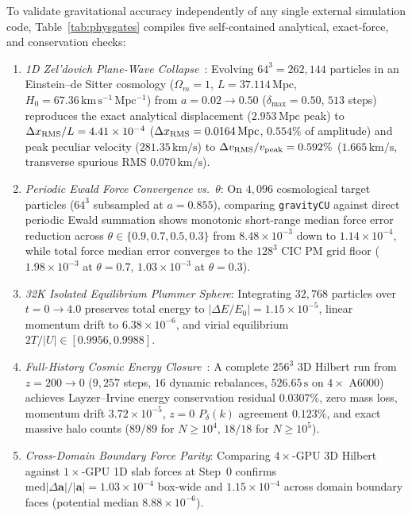 \documentclass[aps,prd,reprint,superscriptaddress,nofootinbib,amsmath,amssymb,floatfix,longbibliography]{revtex4-2}
\begin{document}
To validate gravitational accuracy independently of any single external simulation code, Table~\ref{tab:physgates} compiles five self-contained analytical, exact-force, and conservation checks:
\begin{enumerate}
  \item \textit{1D Zel'dovich Plane-Wave Collapse}~\citep{Zeldovich1970}: Evolving $64^3 = 262{,}144$ particles in an Einstein--de Sitter cosmology ($\Omega_m = 1$, $L = 37.114\,\mathrm{Mpc}$, $H_0 = 67.36\,\mathrm{km\,s^{-1}\,Mpc^{-1}}$) from $a = 0.02 \rightarrow 0.50$ ($\delta_{\max} = 0.50$, $513$ steps) reproduces the exact analytical displacement ($2.953\,\mathrm{Mpc}$ peak) to $\Delta x_{\rm RMS}/L = 4.41\times 10^{-4}$ ($\Delta x_{\rm RMS} = 0.0164\,\mathrm{Mpc}$, $0.554\%$ of amplitude) and peak peculiar velocity ($281.35\,\mathrm{km/s}$) to $\Delta v_{\rm RMS}/v_{\rm peak} = 0.592\%$ ($1.665\,\mathrm{km/s}$, transverse spurious RMS $0.070\,\mathrm{km/s}$).
  \item \textit{Periodic Ewald Force Convergence vs.\ $\theta$}: On $4{,}096$ cosmological target particles ($64^3$ subsampled at $a = 0.855$), comparing \texttt{gravityCU} against direct periodic Ewald summation shows monotonic short-range median force error reduction across $\theta \in \{0.9, 0.7, 0.5, 0.3\}$ from $8.48\times 10^{-3}$ down to $1.14\times 10^{-4}$, while total force median error converges to the $128^3$ CIC PM grid floor ($1.98\times 10^{-3}$ at $\theta = 0.7$, $1.03\times 10^{-3}$ at $\theta = 0.3$).
  \item \textit{32K Isolated Equilibrium Plummer Sphere}: Integrating $32{,}768$ particles over $t = 0 \rightarrow 4.0$ preserves total energy to $|\Delta E / E_0| = 1.15\times 10^{-5}$, linear momentum drift to $6.38\times 10^{-6}$, and virial equilibrium $2T/|U| \in [0.9956, 0.9988]$.
  \item \textit{Full-History Cosmic Energy Closure}~\citep{Layzer1963}: A complete $256^3$ 3D Hilbert run from $z = 200 \rightarrow 0$ ($9{,}257$ steps, $16$ dynamic rebalances, $526.65\,\mathrm{s}$ on $4\times$ A6000) achieves Layzer--Irvine energy conservation residual $0.0307\%$, zero mass loss, momentum drift $3.72\times 10^{-5}$, $z=0$ $P_\delta(k)$ agreement $0.123\%$, and exact massive halo counts ($89/89$ for $N\ge 10^4$, $18/18$ for $N\ge 10^5$).
  \item \textit{Cross-Domain Boundary Force Parity}: Comparing $4\times$-GPU 3D Hilbert against $1\times$-GPU 1D slab forces at Step~0 confirms $\mathrm{med}|\Delta \mathbf{a}|/|\mathbf{a}| = 1.03\times 10^{-4}$ box-wide and $1.15\times 10^{-4}$ across domain boundary faces (potential median $8.88\times 10^{-6}$).
\end{enumerate}
\end{document}
